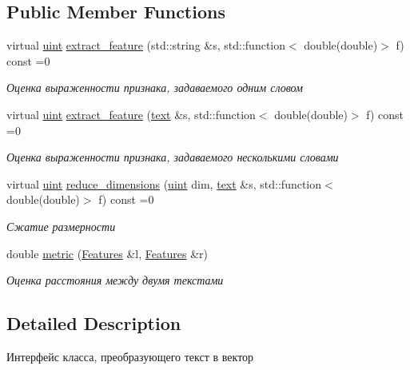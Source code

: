 \subsection*{Public Member Functions}
\begin{DoxyCompactItemize}
\item 
virtual \hyperlink{group__aliases_gae00908f082db728f73e52c3b4932261a}{uint} \hyperlink{classtcc_1_1_features_a840094cf14bfb563d7820e39ae8c6d48}{extract\+\_\+feature} (std\+::string \&s, std\+::function$<$ double(double)$>$ f) const  =0
\begin{DoxyCompactList}\small\item\em Оценка выраженности признака, задаваемого одним словом \end{DoxyCompactList}\item 
virtual \hyperlink{group__aliases_gae00908f082db728f73e52c3b4932261a}{uint} \hyperlink{classtcc_1_1_features_ad70d9deac212689322d4d4e88cff26e3}{extract\+\_\+feature} (\hyperlink{group__aliases_ga085c5ca5bf5645ff17c0ede30f56b08f}{text} \&s, std\+::function$<$ double(double)$>$ f) const  =0
\begin{DoxyCompactList}\small\item\em Оценка выраженности признака, задаваемого несколькими словами \end{DoxyCompactList}\item 
virtual \hyperlink{group__aliases_gae00908f082db728f73e52c3b4932261a}{uint} \hyperlink{classtcc_1_1_features_ae87452022b079681e9904efd4ffbe201}{reduce\+\_\+dimensions} (\hyperlink{group__aliases_gae00908f082db728f73e52c3b4932261a}{uint} dim, \hyperlink{group__aliases_ga085c5ca5bf5645ff17c0ede30f56b08f}{text} \&s, std\+::function$<$ double(double)$>$ f) const  =0
\begin{DoxyCompactList}\small\item\em Сжатие размерности \end{DoxyCompactList}\item 
double \hyperlink{classtcc_1_1_features_af03f2694924c4522c70d41a4a6503ff0}{metric} (\hyperlink{classtcc_1_1_features}{Features} \&l, \hyperlink{classtcc_1_1_features}{Features} \&r)
\begin{DoxyCompactList}\small\item\em Оценка расстояния между двумя текстами \end{DoxyCompactList}\end{DoxyCompactItemize}


\subsection{Detailed Description}
Интерфейс класса, преобразующего текст в вектор 

